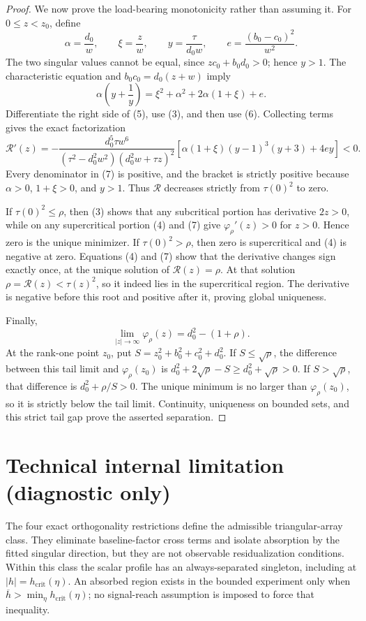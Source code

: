 \documentclass{article}
\begin{document}
\begin{proof}
We now prove the load-bearing monotonicity rather than assuming it.  For \(0\leq z<z_0\), define
\[
 \alpha=\frac{d_0}{w},\qquad \xi=\frac{z}{w},\qquad
 y=\frac{\tau}{d_0w},\qquad e=\frac{(b_0-c_0)^2}{w^2}.
\]
The two singular values cannot be equal, since \(zc_0+b_0d_0>0\); hence \(y>1\).  The characteristic equation and \(b_0c_0=d_0(z+w)\) imply
\[
 \alpha\left(y+\frac1y\right)
 =\xi^2+\alpha^2+2\alpha(1+\xi)+e. \tag{6}
\]
Differentiate the right side of (5), use (3), and then use (6).  Collecting terms gives the exact factorization
\[
 \mathcal R'(z)
 =-\frac{d_0^5\tau w^6}
 {(\tau^2-d_0^2w^2)(d_0^2w+\tau z)^2}
 \left[\alpha(1+\xi)(y-1)^3(y+3)+4ey\right]<0. \tag{7}
\]
Every denominator in (7) is positive, and the bracket is strictly positive because \(\alpha>0\), \(1+\xi>0\), and \(y>1\).  Thus \(\mathcal R\) decreases strictly from \(\tau(0)^2\) to zero.

If \(\tau(0)^2\leq\rho\), then (3) shows that any subcritical portion has derivative \(2z>0\), while on any supercritical portion (4) and (7) give \(\varphi_\rho'(z)>0\) for \(z>0\).  Hence zero is the unique minimizer.  If \(\tau(0)^2>\rho\), then zero is supercritical and (4) is negative at zero.  Equations (4) and (7) show that the derivative changes sign exactly once, at the unique solution of \(\mathcal R(z)=\rho\).  At that solution \(\rho=\mathcal R(z)<\tau(z)^2\), so it indeed lies in the supercritical region.  The derivative is negative before this root and positive after it, proving global uniqueness.

Finally,
\[
 \lim_{|z|\to\infty}\varphi_\rho(z)=d_0^2-(1+\rho).
\]
At the rank-one point \(z_0\), put \(S=z_0^2+b_0^2+c_0^2+d_0^2\).  If \(S\leq\sqrt\rho\), the difference between this tail limit and \(\varphi_\rho(z_0)\) is \(d_0^2+2\sqrt\rho-S\geq d_0^2+\sqrt\rho>0\).  If \(S>\sqrt\rho\), that difference is \(d_0^2+\rho/S>0\).  The unique minimum is no larger than \(\varphi_\rho(z_0)\), so it is strictly below the tail limit.  Continuity, uniqueness on bounded sets, and this strict tail gap prove the asserted separation.
\end{proof}

\section*{Technical internal limitation (diagnostic only)}

The four exact orthogonality restrictions define the admissible triangular-array class.  They eliminate baseline-factor cross terms and isolate absorption by the fitted singular direction, but they are not observable residualization conditions.  Within this class the scalar profile has an always-separated singleton, including at \(|h|=h_{\mathrm{crit}}(\eta)\).  An absorbed region exists in the bounded experiment only when \(\overline h>\min_{\eta}h_{\mathrm{crit}}(\eta)\); no signal-reach assumption is imposed to force that inequality.
\end{document}

